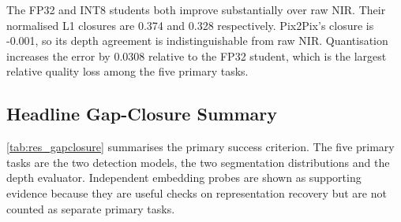 \begin{table}[!htbp]
\centering
\footnotesize
{}
\caption{DepthAnything-Small agreement with native-RGB depth predictions. Normalised L1 is computed after per-image min--max normalisation and should not be read as metres.}
\label{tab:res_depth}
\end{table}

The FP32 and INT8 students both improve substantially over raw NIR. Their normalised L1 closures are 0.374 and 0.328 respectively. Pix2Pix's closure is -0.001, so its depth agreement is indistinguishable from raw NIR. Quantisation increases the error by 0.0308 relative to the FP32 student, which is the largest relative quality loss among the five primary tasks.

\subsection{Headline Gap-Closure Summary}
\label{sec:res_gapclosure}

\autoref{tab:res_gapclosure} summarises the primary success criterion. The five primary tasks are the two detection models, the two segmentation distributions and the depth evaluator. Independent embedding probes are shown as supporting evidence because they are useful checks on representation recovery but are not counted as separate primary tasks.

